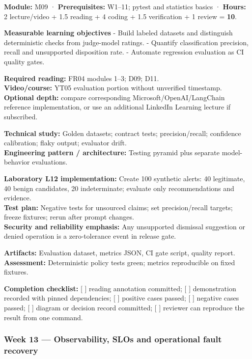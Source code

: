 \documentclass[
  10pt,
]{article}
\begin{document}
\textbf{Module:} M09 · \textbf{Prerequisites:} W1--11; pytest and
statistics basics · \textbf{Hours:} 2 lecture/video + 1.5 reading + 4
coding + 1.5 verification + 1 review = \textbf{10}.

\textbf{Measurable learning objectives} - Build labeled datasets and
distinguish deterministic checks from judge-model ratings. - Quantify
classification precision, recall and unsupported disposition rate. -
Automate regression evaluation as CI quality gates.

\textbf{Required reading:} FR04 modules 1--3; D09; D11.\\
\textbf{Video/course:} YT05 evaluation portion without unverified
timestamp.\\
\textbf{Optional depth:} compare corresponding
Microsoft/OpenAI/LangChain reference implementation, or use an
additional LinkedIn Learning lecture if subscribed.

\textbf{Technical study:} Golden datasets; contract tests;
precision/recall; confidence calibration; flaky output; evaluator
drift.\\
\textbf{Engineering pattern / architecture:} Testing pyramid plus
separate model-behavior evaluations.

\textbf{Laboratory L12 implementation:} Create 100 synthetic alerts: 40
legitimate, 40 benign candidates, 20 indeterminate; evaluate only
recommendations and evidence.\\
\textbf{Test plan:} Negative tests for unsourced claims; set
precision/recall targets; freeze fixtures; rerun after prompt changes.\\
\textbf{Security and reliability emphasis:} Any unsupported dismissal
suggestion or denied operation is a zero-tolerance event in release
gate.

\textbf{Artifacts:} Evaluation dataset, metrics JSON, CI gate script,
quality report.\\
\textbf{Assessment:} Deterministic policy tests green; metrics
reproducible on fixed fixtures.

\textbf{Completion checklist:} {[} {]} reading annotation committed; {[}
{]} demonstration recorded with pinned dependencies; {[} {]} positive
cases passed; {[} {]} negative cases passed; {[} {]} diagram or decision
record committed; {[} {]} reviewer can reproduce the result from one
command.

\subsubsection{Week 13 --- Observability, SLOs and operational fault
recovery}\label{week-13-observability-slos-and-operational-fault-recovery}
\end{document}
